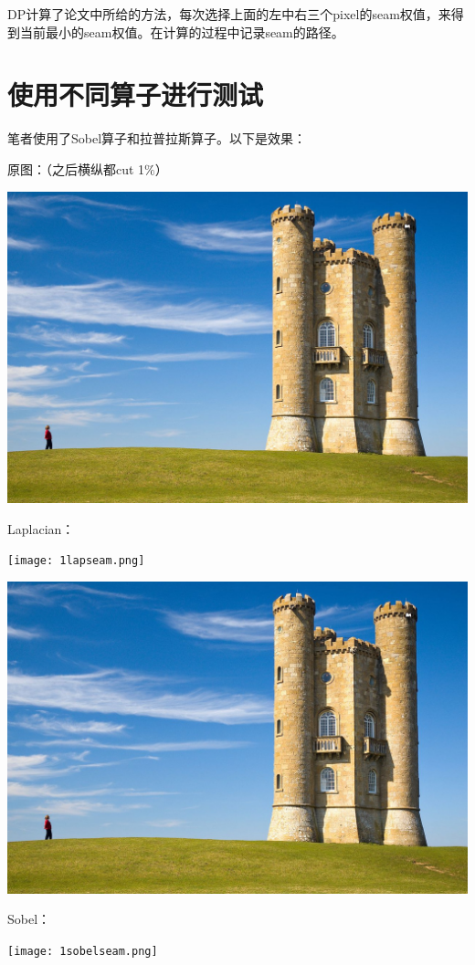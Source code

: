 \documentclass[10pt, a4paper]{article}
\begin{document}
     DP计算了论文中所给的方法，每次选择上面的左中右三个pixel的seam权值，来得到当前最小的seam权值。在计算的过程中记录seam的路径。
  \section{使用不同算子进行测试}
    笔者使用了Sobel算子和拉普拉斯算子。以下是效果：

    原图：（之后横纵都cut 1$\%$）

    \includegraphics[scale = .3]{1.jpg}

    Laplacian：

    \texttt{[image: 1lapseam.png]}

    \includegraphics[scale = .3]{1lap.jpg}

    Sobel：

    \texttt{[image: 1sobelseam.png]}
\end{document}
